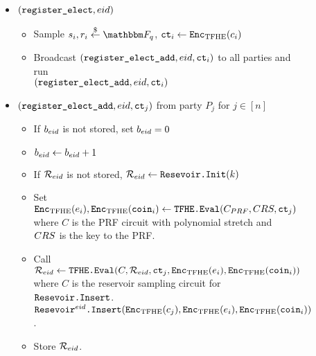 \begin{figure}[H]
{\begin{minipage}{1\textwidth}
			\begin{itemize}
				\item $(\texttt{register\_elect}, {eid})$
				      \begin{itemize}
					      \item Sample $s_i, r_i \randomGet \F_q$, $\texttt{ct}_i \gets \texttt{Enc}_{\mathrm{TFHE}}(c_i)$
					      \item Broadcast $(\texttt{register\_elect\_add}, {eid}, \texttt{ct}_i)$ to all parties and run \\$(\texttt{register\_elect\_add}, {eid}, \texttt{ct}_i)$
				      \end{itemize}
				\item $(\texttt{register\_elect\_add}, {eid}, \texttt{ct}_j)$ from party $P_j$ for $j \in [n]$
				      \begin{itemize}
					      \item If $b_{eid}$ is not stored, set $b_{eid} = 0$
					      \item $b_{eid} \gets b_{eid}+1$
					      \item If $\mathcal{R}_{eid}$ is not stored, $\mathcal{R}_{eid} \gets \texttt{Resevoir.Init}(k)$
					      \item Set $\texttt{Enc}_{\mathrm{TFHE}}(e_i), \texttt{Enc}_{\mathrm{TFHE}}(\texttt{coin}_i) \gets \texttt{TFHE.Eval}(C_{PRF}, CRS, \texttt{ct}_j)$
					            where $C$ is the PRF circuit with polynomial stretch and $CRS$ is the key to the PRF. 
					      \item Call $\mathcal{R}_{eid} \gets \texttt{TFHE.Eval}(C, \mathcal{R}_{eid}, \texttt{ct}_j, \texttt{Enc}_{\mathrm{TFHE}}(e_i), \texttt{Enc}_{\mathrm{TFHE}}(\texttt{coin}_i))$ where
					            $C$ is the reservoir sampling circuit for $\texttt{Resevoir.Insert}$. %
					            $\texttt{Resevoir}^{{eid}}\texttt{.Insert}(\texttt{Enc}_{\mathrm{TFHE}}(c_j), \texttt{Enc}_{\mathrm{TFHE}}(e_i), \texttt{Enc}_{\mathrm{TFHE}}(\texttt{coin}_i))$.
					      \item Store $\mathcal{R}_{eid}$.
				      \end{itemize}


\end{itemize}
\end{minipage}}
\end{figure}

